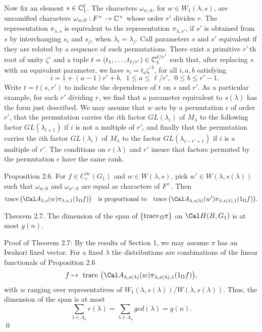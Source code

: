 Now fix an element
  $s \in {\Bbb C}^\ell_1$.
The characters 
  $ \omega_{w,0} $, for
  $w \in W_1(\lambda,s) $,
are unramified characters
  $ \omega_{w,0}: F^{\times} \to {\Bbb C}^{\times} $
whose order $r'$ divides $r$.
The representation $\pi_{\lambda,s}$ is equivalent to the representation
$\pi_{\lambda,s'}$, if $s'$ is obtained from $s$ by interchanging
$s_i$ and $s_j$, when $\lambda_i=\lambda_j$.  Call parameters $s$ and $s'$
equivalent if they are related by a sequence of such permutations.
There exist a primitive $r'$\,th root of unity $\zeta'$ and a
tuple $t=(t_1,\ldots,t_{\ell/r'})\in {\Bbb C}^{\ell/r'}_1$ such that, after
replacing $s$ with an equivalent parameter, we have
$s_i = t_a\zeta^{\prime\,b}$, for all  $i,a,b$  satisfying 
	$$\quad i = 1+(a-1)r'+b,\ \ 1\le a\le \ell/r',\ \  0\le b\le r'-1.$$
Write $t = t(s,r')$ to indicate the dependence of $t$ on $s$ and $r'$.  As a particular
example, for each $r'$ dividing $r$, we find that a parameter equivalent to $s(\lambda)$ has the
form just described.
We may assume that $w$ acts by a permutation $\epsilon$ of order $r'$,
that the permutation carries the $i$th factor $GL(\lambda_i)$ of $M_\lambda$
to the following factor $GL(\lambda_{i+1})$ if $i$ is not a multiple of $r'$, and finally
that the permutation carries the $i$th factor $GL(\lambda_i)$ of $M_\lambda$
to the factor $GL(\lambda_{i-r'+1})$ if $i$ is a multiple of $r'$.
The conditions on $r(\lambda)$ and $r'$ insure that factors permuted by the
permutation $\epsilon$ have the same rank.

\proclaim Proposition {2.6}.
For
  $ f \in C_c^{\infty} (G_1) $ and
  $ w \in W (\lambda,s) $,
pick 
  $ w' \in W (\lambda,s(\lambda)) $
such that
  $ \omega_{w,0}$ and $\omega_{w',0} $
  are equal
as characters of 
  $F^{\times} $.
Then
%
$$
  \text{{\rm trace}} \, 
    \bigl(
      {\Cal A}_{\lambda,s} (w)
      \pi_{\lambda,s,1} 
      ( 1_{\Omega} f)
    \bigr) 
    \quad
    \text{is proportional to}\quad
  \text{{\rm trace}} \, 
    \bigl(
      {\Cal A}_{\lambda,s(\lambda)} (w')
      \pi_{\lambda,s(\lambda),1} 
      ( 1_{\Omega} f)
    \bigr). 
$$
%
\finishproclaim

\proclaim Theorem {2.7}.
The dimension of the span of
  $ \{ \text{{\rm trace}}_{\, \Omega} \pi \} $
on
  $ {\Cal H} (B, G_1) $
is at most
  $ g(n) $.
\finishproclaim

\pproclaim Proof of Theorem 2.7:
By the results of Section 1, we may assume
  $ \pi $
has an Iwahori fixed vector. 
For a fixed 
  $ \lambda $
the distributions are combinations of
the linear functionals of Proposition 2.6
%
$$
  f \mapsto \text{ trace }
  \bigl(
    {\Cal A}_{\lambda,s(\lambda)} (w)
    \pi_{\lambda,s(\lambda),1} (1_{\Omega} f)
  \bigr),
$$
%
with
  $ w $
ranging over representatives of 
  $ W_1 (\lambda,s(\lambda)) /
    W   (\lambda,s(\lambda)) $.
Thus, the dimension of the span is at most
%
$$
  \sum_{\lambda \in \Lambda_n}
  r (\lambda) =
  \sum_{\lambda \in \Lambda_n}
  gcd (\lambda) = g(n).
$$
%
\qed
\finishpproclaim

